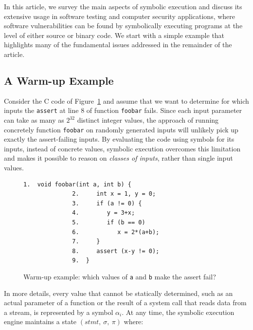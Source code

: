 
In this article, we survey the main aspects of symbolic execution and discuss its extensive usage in software testing and computer security applications, where software vulnerabilities can be found by symbolically executing programs at the level of either source or binary code. We start with a simple example that highlights many of the fundamental issues addressed in the remainder of the article.

\subsection{A Warm-up Example}
\label{symbolic-execution-example}

Consider the C code of Figure~\ref{fig:example-1} and assume that we want to determine for which inputs the  {\tt assert} at line 8 of function \texttt{foobar} fails. Since each input parameter can take as many as $2^{32}$ distinct integer values, the approach of running concretely function \texttt{foobar} on randomly generated inputs will unlikely pick up exactly the assert-failing inputs.
By evaluating the code using symbols for its inputs, instead of concrete values, symbolic execution overcomes this limitation and makes it possible to reason on {\em classes of inputs}, rather than single input values. 

\begin{figure}[t]
\begin{lstlisting}[basicstyle=\ttfamily\small]
              1.  void foobar(int a, int b) {
              2.     int x = 1, y = 0;
              3.     if (a != 0) {
              4.        y = 3+x;
              5.        if (b == 0)
              6.           x = 2*(a+b);
              7.     }
              8.     assert (x-y != 0);
              9.  }
\end{lstlisting}
\caption{Warm-up example: which values of \texttt{a} and \texttt{b} make the assert fail?}
\label{fig:example-1}
\end{figure}

In more details, every value that cannot be statically determined, such as an actual parameter of a function or the result of a system call that reads data from a stream, is represented by a symbol $\alpha_i$. At any time, the symbolic execution engine maintains a state $(stmt,~\sigma,~\pi)$ where:

